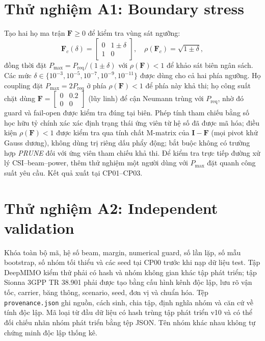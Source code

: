\documentclass[11pt,onecolumn]{IEEEtran}
\begin{document}
\section{Thử nghiệm A1: Boundary stress}
Tạo hai họ ma trận $\mathbf F\geq0$ để kiểm tra vùng sát ngưỡng:
\begin{equation}
\mathbf F_c(\delta)=\begin{bmatrix}0&1\pm\delta\\1&0\end{bmatrix},\quad
\rho(\mathbf F_c)=\sqrt{1\pm\delta},
\label{eq:cycle}
\end{equation}
đồng thời đặt $P_{\max}=P_{\mathrm{req}}/(1\pm\delta)$ với $\rho(\mathbf F)<1$ để khảo sát biên ngân sách. Các mức $\delta\in\{10^{-3},10^{-5},10^{-7},10^{-9},10^{-11}\}$ được dùng cho cả hai phía ngưỡng. Họ coupling đặt $P_{\max}=2P_{\mathrm{req}}$ ở phía $\rho(\mathbf F)<1$ để phía này khả thi; họ công suất chặt dùng $\mathbf F=\begin{bmatrix}0&0.2\\0&0\end{bmatrix}$ (lũy linh) để cận Neumann trùng với $P_{\mathrm{req}}$, nhờ đó guard và fail-open được kiểm tra đúng tại biên. Phép tính tham chiếu bằng số học hữu tỷ chính xác xác định trạng thái ứng viên từ hệ số đã được mã hóa; điều kiện $\rho(\mathbf F)<1$ được kiểm tra qua tính chất M-matrix của $\mathbf I-\mathbf F$ (mọi pivot khử Gauss dương), không dùng trị riêng dấu phẩy động; bắt buộc không có trường hợp \emph{PRUNE} đối với ứng viên tham chiếu khả thi. Để kiểm tra trực tiếp đường xử lý CSI--beam--power, thêm thử nghiệm một người dùng với $P_{\max}$ đặt quanh công suất yêu cầu. Kết quả xuất tại CP01--CP03.

\section{Thử nghiệm A2: Independent validation}
Khóa toàn bộ mã, hệ số beam, margin, numerical guard, số lần lặp, số mẫu bootstrap, số nhóm tối thiểu và các seed tại CP00 trước khi nạp dữ liệu test. Tập DeepMIMO kiểm thử phải có hash và nhóm không gian khác tập phát triển; tập Sionna 3GPP TR 38.901 phải được tạo bằng cấu hình kênh độc lập, lưu rõ vận tốc, carrier, băng thông, scenario, seed, đơn vị và chuẩn hóa. Tệp \texttt{provenance.json} ghi nguồn, cách sinh, chia tập, định nghĩa nhóm và căn cứ về tính độc lập. Mã loại từ đầu dữ liệu có hash trùng tập phát triển v10 và có thể đối chiếu nhãn nhóm phát triển bằng tệp JSON. Tên nhóm khác nhau không tự chứng minh độc lập thống kê.
\end{document}
